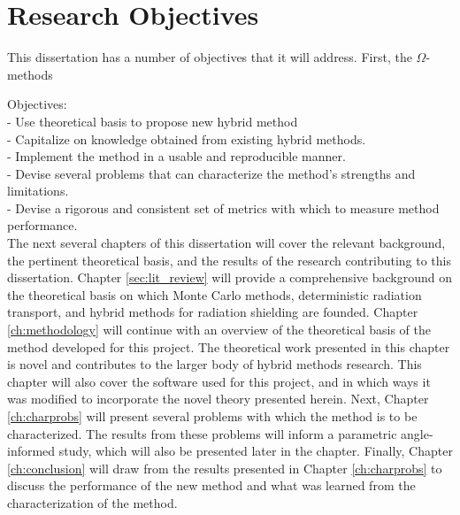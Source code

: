 \section{Research Objectives}
\label{sec:objectives}

This dissertation has a number of objectives that it will address. First, the
$\Omega$-methods

Objectives: \\
- Use theoretical basis to propose new hybrid method \\
- Capitalize on knowledge obtained from existing hybrid methods. \\
- Implement the method in a usable and reproducible manner. \\
- Devise several problems that can characterize the method's strengths and
limitations. \\
- Devise a rigorous and consistent set of metrics with which to measure method
performance. \\

The next several chapters of this dissertation will cover the relevant
background, the pertinent theoretical basis, and the results of the research
contributing to this dissertation. Chapter \ref{sec:lit_review} will provide a
comprehensive background on the theoretical basis on which Monte Carlo methods,
deterministic radiation transport, and hybrid methods for radiation shielding
are founded. Chapter \ref{ch:methodology} will continue with an overview of the
theoretical basis of the method developed for this project. The theoretical work
presented in this chapter is novel and contributes to the larger body of hybrid
methods research. This chapter will also cover the software used for this
project, and in which ways it was modified to incorporate the novel theory
presented herein. Next, Chapter \ref{ch:charprobs} will present several problems
with which the method is to be characterized. The results from these problems
will inform a parametric angle-informed study, which will also be presented
later in the chapter. Finally, Chapter \ref{ch:conclusion} will draw from the
results presented in Chapter \ref{ch:charprobs} to discuss the performance of
the new method and what was learned from the characterization of the method.

